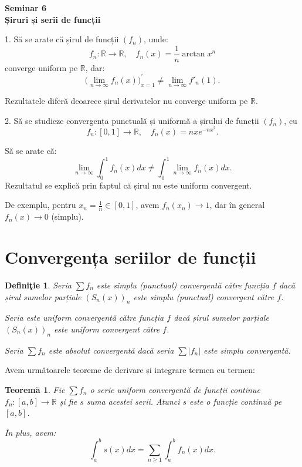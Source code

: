 \documentclass[11pt,a4paper]{article}
\newcommand\RR{\mathbb{R}}
\theoremstyle{dotless}
\newtheorem{theorem}{Teorem\u{a}}[section]
\theoremstyle{dotlessdr}
\newtheorem{definition}{Defini\c{t}ie}[section]
\begin{document}
\begin{center}
  {\large\textbf{Seminar 6 \\ Șiruri și serii de funcții}}
\end{center}

1. Să se arate că șirul de funcții $(f_n)$, unde:
\[
  f_n : \RR \to \RR, \quad f_n(x) = \frac{1}{n} \arctan x^n
\]
converge uniform pe $\RR$, dar:
\[
  \big(\lim_{n \to \infty} f_n(x)\big)^\prime_{x = 1} \neq \lim_{n \to \infty} f'_n(1).
\]

Rezultatele diferă deoarece șirul derivatelor nu converge uniform pe $\RR$.

\vspace{1cm}

2. Să se studieze convergența punctuală și uniformă a șirului de funcții $(f_n)$, cu
\[
  f_n : [0, 1] \to \RR, \quad f_n(x) = nxe^{-nx^2}.
\]

Să se arate că:
\[
  \lim_{n \to \infty} \int_0^1 f_n(x) dx \neq \int_0^1 \lim_{n \to \infty} f_n(x) dx.
\]
Rezultatul se explică prin faptul că șirul nu este uniform convergent.

De exemplu, pentru $x_n = \frac{1}{n} \in [0, 1]$, avem $f_n(x_n) \to 1$, dar
în general $f_n(x) \to 0$ (simplu).


\section{Convergența seriilor de funcții}
\label{sec:serii-f}

\begin{definition}\label{def:pc-sf}
  Seria $\sum f_n$ este \emph{simplu (punctual) convergentă către funcția $f$} dacă șirul
  sumelor parțiale $(S_n(x))_n$ este simplu (punctual) convergent către $f$.

  Seria este \emph{uniform convergentă către funcția $f$} dacă șirul sumelor parțiale
  $(S_n(x))_n$ este uniform convergent către $f$.

  Seria $\sum f_n$ este \emph{absolut convergentă} dacă seria $\sum |f_n|$ este
  simplu convergentă.
\end{definition}

Avem următoarele teoreme de derivare și integrare termen cu termen:

\begin{theorem}\label{thm:int-t}
  Fie $\sum f_n$ o serie uniform convergentă de funcții continue $f_n : [a, b] \to \RR$
  și fie $s$ suma acestei serii. Atunci $s$ este o funcție continuă pe $[a, b]$.

  În plus, avem:
  \[
    \int_a^b s(x) dx = \sum_{n \geq 1} \int_a^b f_n(x) dx.
  \]
\end{theorem}
\end{document}
